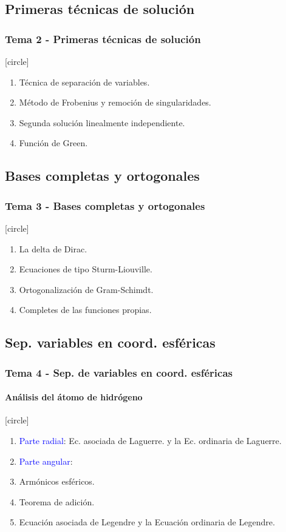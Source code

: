 \documentclass[12pt]{beamer}
\begin{document}
\subsection{Primeras técnicas de solución}

\begin{frame}
\frametitle{Tema 2 - Primeras técnicas de solución}
[circle]
\begin{enumerate}[<+->]
\item Técnica de separación de variables.
\item Método de Frobenius y remoción de singularidades.
\item Segunda solución linealmente independiente.
\item Función de Green.
\end{enumerate}
\end{frame}

\subsection{Bases completas y ortogonales}

\begin{frame}
\frametitle{Tema 3 - Bases completas y ortogonales}
[circle]
\begin{enumerate}[<+->]
\item La delta de Dirac. 
\item Ecuaciones de tipo Sturm-Liouville.
\item Ortogonalización de Gram-Schimdt.
\item Completes de las funciones propias.
\end{enumerate}
\end{frame}

\subsection{Sep. variables en coord. esféricas}
\begin{frame}
\frametitle{Tema 4 - Sep. de variables en coord. esféricas}
\framesubtitle{Análisis del átomo de hidrógeno}
[circle]
\begin{enumerate}[<+->]
\item \textcolor{blue}{Parte radial}: Ec. asociada de Laguerre. y la Ec. ordinaria de Laguerre.
\item \textcolor{blue}{Parte angular}:
\item Armónicos esféricos.
\item Teorema de adición.
\item Ecuación asociada de Legendre y la Ecuación ordinaria de Legendre.
\end{enumerate}
\end{frame}
\end{document}
